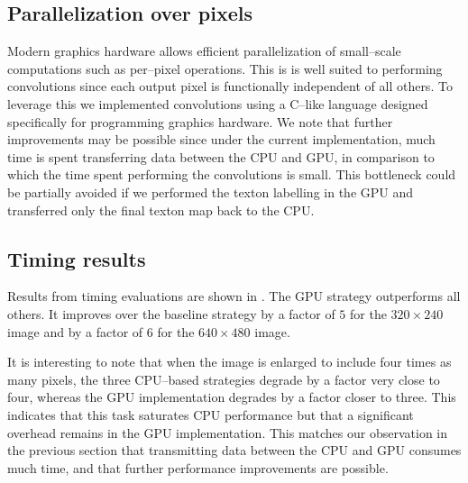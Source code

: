 \subsection{Parallelization over pixels}
Modern graphics hardware allows efficient parallelization of
small--scale computations such as per--pixel operations. This is is
well suited to performing convolutions since each output pixel is
functionally independent of all others. To leverage this we
implemented convolutions using a C--like language designed
specifically for programming graphics hardware. We note that further
improvements may be possible since under the current implementation,
much time is spent transferring data between the CPU and GPU, in
comparison to which the time spent performing the convolutions is
small. This bottleneck could be partially avoided if we performed the
texton labelling in the GPU and transferred only the final texton map
back to the CPU.

\subsection{Timing results}
Results from timing evaluations are shown in
. The GPU strategy outperforms all
others. It improves over the baseline strategy by a factor of $5$ for
the $320 \times 240$ image and by a factor of $6$ for the $640 \times
480$ image.

It is interesting to note that when the image is enlarged to
include four times as many pixels, the three CPU--based strategies
degrade by a factor very close to four, whereas the GPU implementation
degrades by a factor closer to three. This indicates that this task
saturates CPU performance but that a significant overhead remains in
the GPU implementation. This matches our observation in the previous
section that transmitting data between the CPU and GPU consumes much
time, and that further performance improvements are possible.



